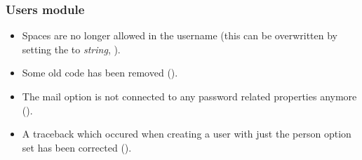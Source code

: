 \subsubsection{Users module}
\begin{itemize}
\item Spaces are no longer allowed in the username (this can be overwritten by setting the
 to \emph{string}, ).
\item Some old code has been removed ().
\item The mail option is not connected to any password related properties anymore ().
\item A traceback which occured when creating a user with just the person option set has been corrected ().
\end{itemize}






